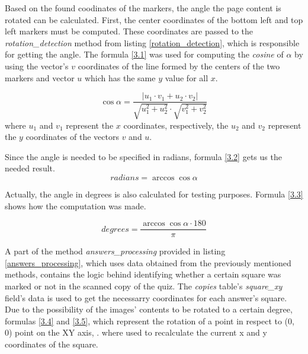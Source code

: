 

Based on the found coodinates of the markers, the angle the page content is rotated can be calculated. First, the center coordinates of the bottom left and top left markers must be computed. These coordinates are passed to the \textit{rotation\_detection} method from listing \ref{rotation_detection}, which is responsible for getting the angle. The formula \ref{3.1} \cite{cosalpha} was used for computing the \textit{cosine} of $\alpha$ by using the vector's $v$ coordinates of the line formed by the centers of the two markers and vector $u$ which has the same $y$ value for all $x$.

\begin{equation}
\cos \alpha = \frac{\left\vert u_{1} \cdot v_{1} + u_{2} \cdot v_{2} \right\vert }{\sqrt{u_{1}^{2}+u_{2}^{2}} \cdot \sqrt{v_{1}^{2}+v_{2}^{2}}}  \label{3.1}
\end{equation}
where $u_{1}$ and $v_{1}$ represent the $x$ coordinates, respectively, the $u_{2}$ and $v_{2}$ represent the $y$ coordinates of the vectors $v$ and $u$.

Since the angle is needed to be specified in radians, formula \ref{3.2} gets us the needed result.
\begin{equation}
radians = \arccos{\cos \alpha} \label{3.2}
\end{equation}

Actually, the angle in degrees is also calculated for testing purposes. Formula \ref{3.3} shows how the computation was made.

\begin{equation}
degrees = \frac{\arccos \cos \alpha \cdot 180}{\pi} \label{3.3}
\end{equation}




A part of the method \textit{answers\_processing} provided in listing \ref{answers_processing}, which uses data obtained from the previously mentioned methods, contains the logic behind identifying whether a certain square was marked or not in the scanned copy of the quiz. The \textit{copies} table's \textit{square\_xy} field's data is used to get the necessarry coordinates for each answer's square. Due to the possibility of the images' contents to be rotated to a certain degree, formulas \ref{3.4} and \ref{3.5}, which represent the rotation of a point in respect to (0, 0) point on the XY axis, \cite{point_rotation}. where used to recalculate the current x and y coordinates of the square. 

